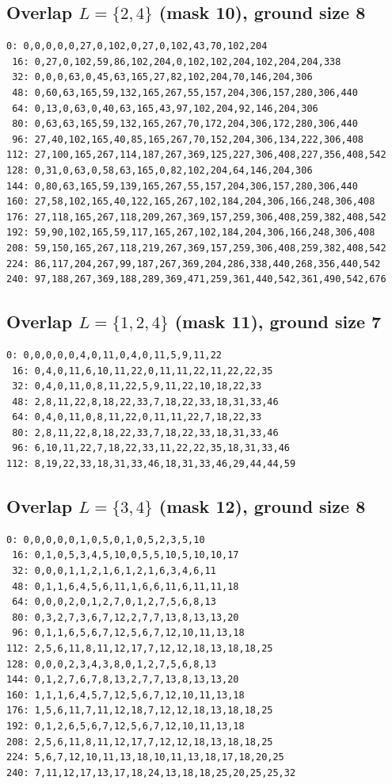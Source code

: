 \documentclass[11pt]{article}
\begin{document}
\subsection*{Overlap $L=\{2,4\}$ (mask 10), ground size 8}
\begin{Verbatim}[fontsize=\footnotesize]
  0: 0,0,0,0,0,27,0,102,0,27,0,102,43,70,102,204
 16: 0,27,0,102,59,86,102,204,0,102,102,204,102,204,204,338
 32: 0,0,0,63,0,45,63,165,27,82,102,204,70,146,204,306
 48: 0,60,63,165,59,132,165,267,55,157,204,306,157,280,306,440
 64: 0,13,0,63,0,40,63,165,43,97,102,204,92,146,204,306
 80: 0,63,63,165,59,132,165,267,70,172,204,306,172,280,306,440
 96: 27,40,102,165,40,85,165,267,70,152,204,306,134,222,306,408
112: 27,100,165,267,114,187,267,369,125,227,306,408,227,356,408,542
128: 0,31,0,63,0,58,63,165,0,82,102,204,64,146,204,306
144: 0,80,63,165,59,139,165,267,55,157,204,306,157,280,306,440
160: 27,58,102,165,40,122,165,267,102,184,204,306,166,248,306,408
176: 27,118,165,267,118,209,267,369,157,259,306,408,259,382,408,542
192: 59,90,102,165,59,117,165,267,102,184,204,306,166,248,306,408
208: 59,150,165,267,118,219,267,369,157,259,306,408,259,382,408,542
224: 86,117,204,267,99,187,267,369,204,286,338,440,268,356,440,542
240: 97,188,267,369,188,289,369,471,259,361,440,542,361,490,542,676
\end{Verbatim}
\subsection*{Overlap $L=\{1,2,4\}$ (mask 11), ground size 7}
\begin{Verbatim}[fontsize=\footnotesize]
  0: 0,0,0,0,0,4,0,11,0,4,0,11,5,9,11,22
 16: 0,4,0,11,6,10,11,22,0,11,11,22,11,22,22,35
 32: 0,4,0,11,0,8,11,22,5,9,11,22,10,18,22,33
 48: 2,8,11,22,8,18,22,33,7,18,22,33,18,31,33,46
 64: 0,4,0,11,0,8,11,22,0,11,11,22,7,18,22,33
 80: 2,8,11,22,8,18,22,33,7,18,22,33,18,31,33,46
 96: 6,10,11,22,7,18,22,33,11,22,22,35,18,31,33,46
112: 8,19,22,33,18,31,33,46,18,31,33,46,29,44,44,59
\end{Verbatim}
\subsection*{Overlap $L=\{3,4\}$ (mask 12), ground size 8}
\begin{Verbatim}[fontsize=\footnotesize]
  0: 0,0,0,0,0,1,0,5,0,1,0,5,2,3,5,10
 16: 0,1,0,5,3,4,5,10,0,5,5,10,5,10,10,17
 32: 0,0,0,1,1,2,1,6,1,2,1,6,3,4,6,11
 48: 0,1,1,6,4,5,6,11,1,6,6,11,6,11,11,18
 64: 0,0,0,2,0,1,2,7,0,1,2,7,5,6,8,13
 80: 0,3,2,7,3,6,7,12,2,7,7,13,8,13,13,20
 96: 0,1,1,6,5,6,7,12,5,6,7,12,10,11,13,18
112: 2,5,6,11,8,11,12,17,7,12,12,18,13,18,18,25
128: 0,0,0,2,3,4,3,8,0,1,2,7,5,6,8,13
144: 0,1,2,7,6,7,8,13,2,7,7,13,8,13,13,20
160: 1,1,1,6,4,5,7,12,5,6,7,12,10,11,13,18
176: 1,5,6,11,7,11,12,18,7,12,12,18,13,18,18,25
192: 0,1,2,6,5,6,7,12,5,6,7,12,10,11,13,18
208: 2,5,6,11,8,11,12,17,7,12,12,18,13,18,18,25
224: 5,6,7,12,10,11,13,18,10,11,13,18,17,18,20,25
240: 7,11,12,17,13,17,18,24,13,18,18,25,20,25,25,32
\end{Verbatim}
\end{document}
